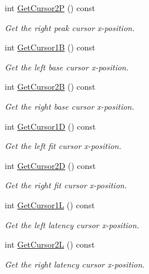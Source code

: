 \begin{DoxyCompactItemize}
int \hyperlink{classwxStfCursorsDlg_a554f804d5baa56a0a37adb036633db8e}{GetCursor2P} () const 
\begin{DoxyCompactList}\small\item\em Get the right peak cursor x-\/position. \item\end{DoxyCompactList}\item 
int \hyperlink{classwxStfCursorsDlg_a4580524b0a8eab02f773f9d1143f0f31}{GetCursor1B} () const 
\begin{DoxyCompactList}\small\item\em Get the left base cursor x-\/position. \item\end{DoxyCompactList}\item 
int \hyperlink{classwxStfCursorsDlg_af6ecc16a7642f2600d1ff26c0725fed5}{GetCursor2B} () const 
\begin{DoxyCompactList}\small\item\em Get the right base cursor x-\/position. \item\end{DoxyCompactList}\item 
int \hyperlink{classwxStfCursorsDlg_a5ded86530ce6603ccc150c2d7eff2f72}{GetCursor1D} () const 
\begin{DoxyCompactList}\small\item\em Get the left fit cursor x-\/position. \item\end{DoxyCompactList}\item 
int \hyperlink{classwxStfCursorsDlg_abd4e5afc85fbaa1bcb9f1a157781ee99}{GetCursor2D} () const 
\begin{DoxyCompactList}\small\item\em Get the right fit cursor x-\/position. \item\end{DoxyCompactList}\item 
int \hyperlink{classwxStfCursorsDlg_aa66c4a6d63fa6846e281d4810554a31e}{GetCursor1L} () const 
\begin{DoxyCompactList}\small\item\em Get the left latency cursor x-\/position. \item\end{DoxyCompactList}\item 
int \hyperlink{classwxStfCursorsDlg_a2cdeaf3197df8ccf5fe22d7ad57a1719}{GetCursor2L} () const 
\begin{DoxyCompactList}\small\item\em Get the right latency cursor x-\/position. \item\end{DoxyCompactList}\item 

\end{DoxyCompactItemize}

